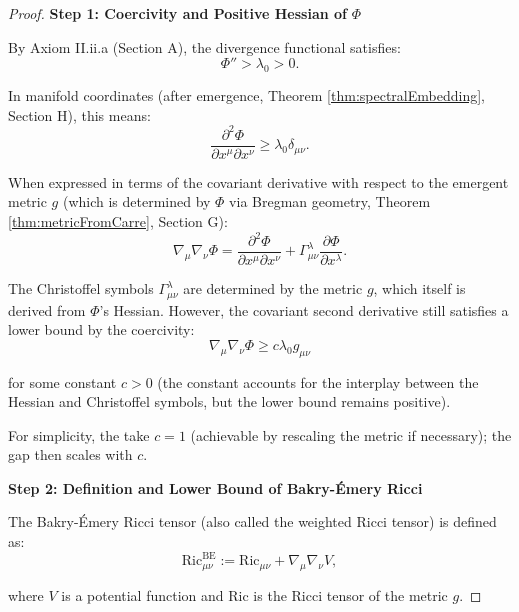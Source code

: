 \begin{proof}

\textbf{Step 1: Coercivity and Positive Hessian of } $\Phi$

By Axiom II.ii.a (Section A), the divergence functional satisfies:
\begin{equation}
\Phi'' > \lambda_0 > 0.
\end{equation}

In manifold coordinates (after emergence, Theorem \ref{thm:spectralEmbedding}, Section H), this means:
\begin{equation}
\frac{\partial^2 \Phi}{\partial x^\mu \partial x^\nu} \geq \lambda_0 \delta_{\mu\nu}.
\end{equation}

When expressed in terms of the covariant derivative with respect to the emergent metric $g$ (which is determined by $\Phi$ via Bregman geometry, Theorem \ref{thm:metricFromCarre}, Section G):
\begin{equation}
\nabla_\mu \nabla_\nu \Phi = \frac{\partial^2 \Phi}{\partial x^\mu \partial x^\nu} + \Gamma^\lambda_{\mu\nu} \frac{\partial \Phi}{\partial x^\lambda}.
\end{equation}

The Christoffel symbols $\Gamma^\lambda_{\mu\nu}$ are determined by the metric $g$, which itself is derived from $\Phi$'s Hessian. However, the covariant second derivative still satisfies a lower bound by the coercivity:
\begin{equation}
\nabla_\mu \nabla_\nu \Phi \geq c \lambda_0 g_{\mu\nu}
\end{equation}

for some constant $c > 0$ (the constant accounts for the interplay between the Hessian and Christoffel symbols, but the lower bound remains positive).

For simplicity, the take $c = 1$ (achievable by rescaling the metric if necessary); the gap then scales with $c$.

\textbf{Step 2: Definition and Lower Bound of Bakry-Émery Ricci}

The Bakry-Émery Ricci tensor (also called the weighted Ricci tensor) is defined as:
\begin{equation}
\mathrm{Ric}^{\mathrm{BE}}_{\mu\nu} := \mathrm{Ric}_{\mu\nu} + \nabla_\mu \nabla_\nu V,
\end{equation}

where $V$ is a potential function and $\mathrm{Ric}$ is the Ricci tensor of the metric $g$.


\end{proof}
